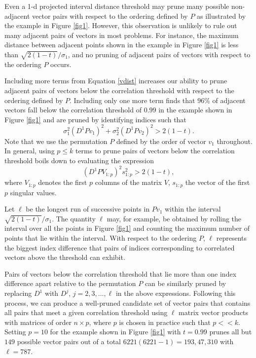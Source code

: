 \documentclass[article]{jss}
\numberwithin{algorithmctr}{section}
\begin{document}
Even a 1-d projected interval distance threshold may prune many possible
non-adjacent vector pairs with respect to the ordering defined by $P$ as
illustrated by the example in Figure \ref{fig1}.  However, this observation is
unlikely to rule out many adjacent pairs of vectors in most problems.  For
instance, the maximum distance between adjacent points shown in the example in
Figure \ref{fig1} is less than $\sqrt{2(1-t)}/\sigma_1$, and no pruning of
adjacent pairs of vectors with respect to the ordering $P$ occurs.

Including more terms from Equation \ref{vdist} increases our ability to prune
adjacent pairs of vectors below the correlation threshold with respect to the
ordering defined by $P$.  Including only one more term finds that 96\% of
adjacent vectors fall below the correlation threshold of $0.99$ in the
example shown in Figure \ref{fig1} and are pruned by identifying indices such
that
\[
\sigma_1^2 (D^1 P v_1)^2 +
\sigma_2^2 (D^1 P v_2)^2 > 2(1-t).
\]
Note that we use the permutation $P$ defined by the order of vector $v_1$
throughout.  In general, using $p\le k$ terms to prune pairs of vectors
below the correlation threshold boils down to evaluating the expression
\begin{equation}\label{proj}
(D^1 P V_{1:p} )^2 s_{1:p}^2 > 2(1-t),
\end{equation}
where 
$V_{1:p}$ denotes the first $p$ columns of the
matrix $V$, $s_{1:p}$ the vector of the first $p$ singular values.

Let $\ell$ be the longest run of successive points in $P v_1$ within the
interval $\sqrt{2(1-t)}/\sigma_1$.  The quantity $\ell$ may, for example, be
obtained by rolling the interval over all the points in Figure \ref{fig1} and
counting the maximum number of points that lie within the interval.  With
respect to the ordering $P$, $\ell$ represents the biggest index difference
that pairs of indices corresponding to correlated vectors above the threshold
can exhibit.

Pairs of vectors below the correlation threshold that lie more than one index
difference apart relative to the permutation $P$ can be similarly pruned by
replacing $D^1$ with $D^j$, $j=2,3,\ldots,\ell$ in the above expressions.
Following this process, we can produce a well-pruned candidate set of vector
pairs that contains all pairs that meet a given correlation threshold using
$\ell$ matrix vector products with matrices of order $n \times p$, where $p$ is
chosen in practice such that $p<<k$. Setting $p=10$ for the example shown in
Figure \ref{fig1} with $t=0.99$ prunes all but $149$ possible vector pairs out of a total
$6221(6221 - 1) = 193,47,310$ with $\ell=787$.
\end{document}
